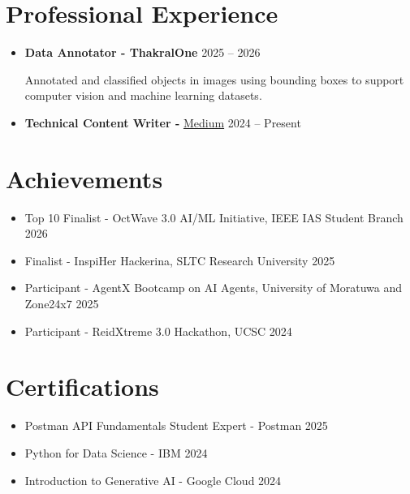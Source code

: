 \documentclass[10pt,a4paper]{article}
\begin{document}
\section{Professional Experience}

\begin{itemize}

    \item \textbf{Data Annotator - ThakralOne}
    \hfill 2025 -- 2026

    Annotated and classified objects in images using bounding boxes to
    support computer vision and machine learning datasets.

    \item \textbf{Technical Content Writer -}
    \href{https://medium.com/@savandikodithuwakku}{Medium}
    \hfill 2024 -- Present

\end{itemize}

\section{Achievements}

\begin{itemize}

    \item Top 10 Finalist - OctWave 3.0 AI/ML Initiative,
    IEEE IAS Student Branch \hfill 2026

    \item Finalist - InspiHer Hackerina,
    SLTC Research University \hfill 2025

    \item Participant - AgentX Bootcamp on AI Agents,
    University of Moratuwa and Zone24x7 \hfill 2025

    \item Participant - ReidXtreme 3.0 Hackathon,
    UCSC \hfill 2024

\end{itemize}

\section{Certifications}

\begin{itemize}

    \item Postman API Fundamentals Student Expert - Postman
    \hfill 2025

    \item Python for Data Science - IBM
    \hfill 2024

    \item Introduction to Generative AI - Google Cloud
    \hfill 2024

\end{itemize}
\end{document}
